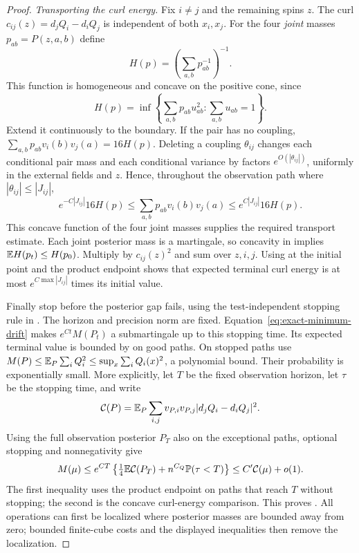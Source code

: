 \begin{proof}
\emph{Transporting the curl energy.}
Fix $i\ne j$ and the remaining spins $z$.  The curl
$c_{ij}(z)=d_jQ_i-d_iQ_j$ is independent of both $x_i,x_j$.
For the four \emph{joint} masses $p_{ab}=P(z,a,b)$ define
\[
 H(p)=\left(\sum_{a,b}p_{ab}^{-1}\right)^{-1}.
\]
This function is homogeneous and concave on the positive cone, since
\begin{equation}\label{eq:exact-harmonic-concavity}
 H(p)=\inf\left\{\sum_{a,b}p_{ab}u_{ab}^2:
                         \sum_{a,b}u_{ab}=1\right\}.
\end{equation}
Extend it continuously to the boundary.  If the pair has no coupling,
$\sum_{a,b}p_{ab}v_i(b)v_j(a)=16H(p)$.
Deleting a coupling $\theta_{ij}$ changes each conditional pair mass
and each conditional variance by factors $e^{O(|\theta_{ij}|)}$,
uniformly in the external fields and $z$.  Hence, throughout the
observation path where $|\theta_{ij}|\le|J_{ij}|$,
\begin{equation}\label{eq:exact-pair-weight}
 e^{-C|J_{ij}|}16H(p)
 \le\sum_{a,b}p_{ab}v_i(b)v_j(a)
 \le e^{C|J_{ij}|}16H(p).
\end{equation}
This concave function of the four joint masses supplies the required
transport estimate.  Each joint posterior mass is a martingale, so
concavity in
 implies
$\mathbb E H(p_t)\le H(p_0)$.  Multiply by $c_{ij}(z)^2$ and sum over $z,i,j$.
Using  at the initial point and the product
endpoint shows that expected terminal curl energy is at most
$e^{C\max|J_{ij}|}$ times its initial value.

Finally stop before the posterior gap fails, using the test-independent
stopping rule in .  The horizon and precision
norm are fixed.  Equation~\eqref{eq:exact-minimum-drift} makes
$e^{Ct}M(P_t)$ a submartingale up to this stopping time.  Its expected
terminal value is bounded by  on good paths.
On stopped paths use
$M(P)\le\mathbb E_P\sum_i Q_i^2\le\sup_x\sum_iQ_i(x)^2$, a polynomial bound.
Their probability is exponentially small.  More explicitly, let $T$
be the fixed observation horizon, let $\tau$ be the stopping time, and
write
\[
 \mathcal C(P)=\mathbb E_P\sum_{i,j}v_{P,i}v_{P,j}
                         |d_jQ_i-d_iQ_j|^2.
\]
Using the full observation posterior $P_T$ also on the exceptional paths,
optional stopping and nonnegativity give
\[
 M(\mu)
 \le e^{CT}\left\{\tfrac14\mathbb E\mathcal C(P_T)
                        +n^{C_Q}\mathbb P(\tau<T)\right\}
 \le C'\mathcal C(\mu)+o(1).
\]
The first inequality uses the product endpoint on paths that reach $T$
without stopping; the second is the concave curl-energy comparison.
This proves .
All operations can first be localized where posterior masses are bounded
away from zero; bounded finite-cube costs and the displayed inequalities
then remove the localization.
\end{proof}

